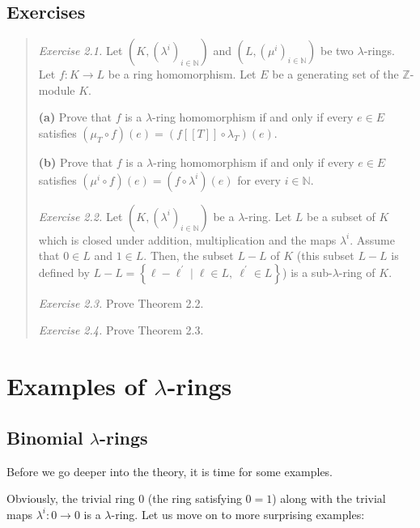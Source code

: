 \documentclass[numbers=enddot,12pt,final,onecolumn,notitlepage]{scrartcl}%
\begin{document}
\subsection{Exercises}

\begin{quotation}
\textit{Exercise 2.1.} Let $\left(  K,\left(  \lambda^{i}\right)
_{i\in\mathbb{N}}\right)  $ and $\left(  L,\left(  \mu^{i}\right)
_{i\in\mathbb{N}}\right)  $ be two $\lambda$-rings. Let $f:K\rightarrow L$ be
a ring homomorphism. Let $E$ be a generating set of the $\mathbb{Z}$-module
$K$.

\textbf{(a)} Prove that $f$ is a $\lambda$-ring homomorphism if and only if
every $e\in E$ satisfies $\left(  \mu_{T}\circ f\right)  \left(  e\right)
=\left(  f\left[  \left[  T\right]  \right]  \circ\lambda_{T}\right)  \left(
e\right)  $.

\textbf{(b)} Prove that $f$ is a $\lambda$-ring homomorphism if and only if
every $e\in E$ satisfies $\left(  \mu^{i}\circ f\right)  \left(  e\right)
=\left(  f\circ\lambda^{i}\right)  \left(  e\right)  $ for every
$i\in\mathbb{N}$.

\textit{Exercise 2.2.} Let $\left(  K,\left(  \lambda^{i}\right)
_{i\in\mathbb{N}}\right)  $ be a $\lambda$-ring. Let $L$ be a subset of $K$
which is closed under addition, multiplication and the maps $\lambda^{i}$.
Assume that $0\in L$ and $1\in L$. Then, the subset $L-L$ of $K$ (this subset
$L-L$ is defined by $L-L=\left\{  \ell-\ell^{\prime}\mid\ell\in L,\ \ell
^{\prime}\in L\right\}  $) is a sub-$\lambda$-ring of $K$.

\textit{Exercise 2.3.} Prove Theorem 2.2.

\textit{Exercise 2.4.} Prove Theorem 2.3.
\end{quotation}

\section{Examples of $\lambda$-rings}

\subsection{Binomial $\lambda$-rings}

Before we go deeper into the theory, it is time for some examples.

Obviously, the trivial ring $0$ (the ring satisfying $0=1$) along with the
trivial maps $\lambda^{i}:0\rightarrow0$ is a $\lambda$-ring. Let us move on
to more surprising examples:
\end{document}
